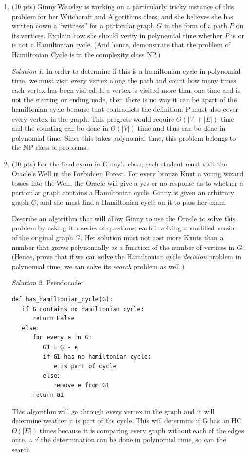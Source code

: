 \documentclass[12pt]{article}
\theoremstyle{remark}
\newtheorem*{solution}{Solution}
\begin{document}
\begin{enumerate}
	\begin{enumerate}
	\item (10 pts) Ginny Weasley is working on a particularly tricky instance of this problem for her Witchcraft and Algorithms class, and she believes she has written down a ``witness'' for a particular graph $G$ in the form of a path $P$ on its vertices. Explain how she should verify in polynomial time whether $P$ is or is not a Hamiltonian cycle. (And hence, demonstrate that the problem of Hamiltonian Cycle is in the complexity class NP.)
	\begin{solution}
    In order to determine if this is a hamiltonian cycle in polynomial time, we must visit every vertex along the path and count how many times each vertex has been visited. If a vertex is visited more than one time and is not the starting or ending node, then there is no way it can be apart of the hamiltonian cycle because that contradicts the definition. P must also cover every vertex in the graph. This progress would require $O(|V| + |E|)$ time and the counting can be done in $O(|V|)$ time and thus can be done in polynomial time. Since this takes polynomial time, this problem belongs to the NP class of problems.
    \end{solution}
    \pagebreak
    
	
	
	\item (10 pts) For the final exam in Ginny's class, each student must visit the Oracle's Well in the Forbidden Forest. For every bronze Knut a young wizard tosses into the Well, the Oracle will give a yes or no response as to whether a particular graph contains a Hamiltonian cycle. Ginny is given an arbitrary graph $G$, and she must find a Hamiltonian cycle on it to pass her exam.
	
	Describe an algorithm that will allow Ginny to use the Oracle to solve this problem by asking it a series of questions, each involving a modified version of the original graph $G$. Her solution must not cost more Knuts than a number that grows polynomially as a function of the number of vertices in $G$. (Hence, prove that if we can solve the Hamiltonian cycle \textit{decision} problem in polynomial time, we can solve its \textit{search} problem as well.)\\
		\begin{solution}
    Pseudocode:
\begin{verbatim}
def has_hamiltonian_cycle(G):
   if G contains no hamiltonian cycle:
      return False
   else:
      for every e in G:
         G1 = G - e
         if G1 has no hamiltonian cycle:
            e is part of cycle
         else:
            remove e from G1
      return G1
\end{verbatim}
This algorithm will go through every vertex in the graph and it will determine weather it is part of the cycle. This will determine if G has an HC $O(|E|)$ times because it is comparing every graph without each of the edges once.  $\therefore$ if the determination can be done in polynomial time, so can the search.
    \end{solution}
	
	\end{enumerate}
    
\end{enumerate}
\end{document}
